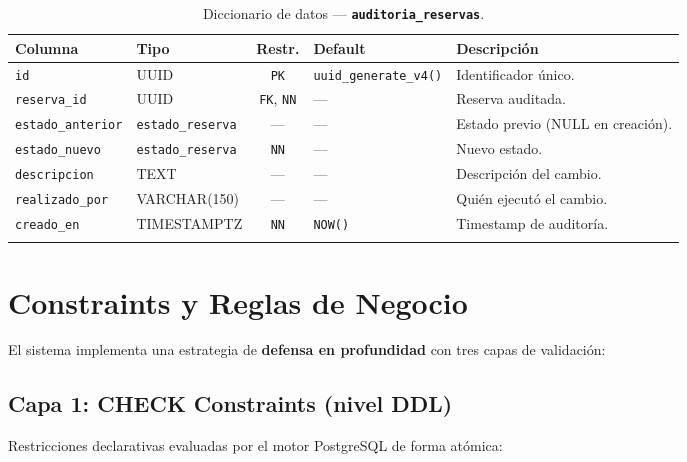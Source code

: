 \documentclass[12pt, a4paper]{article}
\newcommand{\pk}{\texttt{PK}}
\newcommand{\fk}{\texttt{FK}}
\newcommand{\nn}{\texttt{NN}}
\newcommand{\tname}[1]{\texttt{\textbf{#1}}}
\newcommand{\cname}[1]{\texttt{#1}}
\begin{document}
\begin{longtable}{l l c l p{4.5cm}}
    \toprule
    \textbf{Columna} & \textbf{Tipo} & \textbf{Restr.} & \textbf{Default} & \textbf{Descripción} \\
    \midrule
    \endhead
    \cname{id} & UUID & \pk & \texttt{uuid\_generate\_v4()} & Identificador único. \\
    \cname{reserva\_id} & UUID & \fk, \nn & --- & Reserva auditada. \\
    \cname{estado\_anterior} & \texttt{estado\_reserva} & --- & --- & Estado previo (NULL en creación). \\
    \cname{estado\_nuevo} & \texttt{estado\_reserva} & \nn & --- & Nuevo estado. \\
    \cname{descripcion} & TEXT & --- & --- & Descripción del cambio. \\
    \cname{realizado\_por} & VARCHAR(150) & --- & --- & Quién ejecutó el cambio. \\
    \cname{creado\_en} & TIMESTAMPTZ & \nn & \texttt{NOW()} & Timestamp de auditoría. \\
    \bottomrule
    \caption{Diccionario de datos --- \tname{auditoria\_reservas}.}
\end{longtable}


\section{Constraints y Reglas de Negocio}

El sistema implementa una estrategia de \textbf{defensa en profundidad} con tres capas de validación:

\subsection{Capa 1: CHECK Constraints (nivel DDL)}

Restricciones declarativas evaluadas por el motor PostgreSQL de forma atómica:
\end{document}
